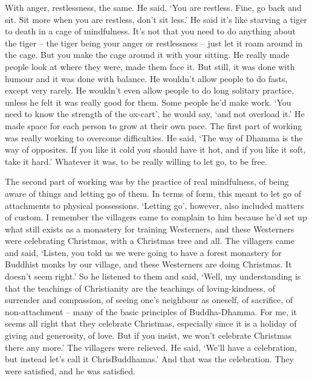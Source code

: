 With anger, restlessness, the same. He said, `You are restless. Fine, go
back and sit. Sit more when you are restless, don't sit less.' He said
it's like starving a tiger to death in a cage of mindfulness. It's not
that you need to do anything about the tiger -- the tiger being your
anger or restlessness -- just let it roam around in the cage. But you
make the cage around it with your sitting. He really made people look at
where they were, made them face it. But still, it was done with humour
and it was done with balance. He wouldn't allow people to do fasts, 
except very rarely. He wouldn't even allow people to do long solitary
practice, unless he felt it was really good for them. Some people he'd
make work. `You need to know the strength of the ox-cart', he would say, 
`and not overload it.' He made space for each person to grow at their
own pace. The first part of working was really working to overcome
difficulties. He said, `The way of Dhamma is the way of opposites. If
you like it cold you should have it hot, and if you like it soft, take
it hard.' Whatever it was, to be really willing to let go, to be free. 

The second part of working was by the practice of real mindfulness, of
being aware of things and letting go of them. In terms of form, this
meant to let go of attachments to physical possessions. `Letting go', 
however, also included matters of custom. I remember the villagers came
to complain to him because he'd set up what still exists as a monastery
for training Westerners, and these Westerners were celebrating
Christmas, with a Christmas tree and all. The villagers came and said, 
`Listen, you told us we were going to have a forest monastery for
Buddhist monks by our village, and these Westerners are doing Christmas. 
It doesn't seem right.' So he listened to them and said, `Well, my
understanding is that the teachings of Christianity are the teachings of
loving-kindness, of surrender and compassion, of seeing one's neighbour
as oneself, of sacrifice, of non-attachment -- many of the basic
principles of Buddha-Dhamma. For me, it seems all right that they
celebrate Christmas, especially since it is a holiday of giving and
generosity, of love. But if you insist, we won't celebrate Christmas
there any more.' The villagers were relieved. He said, `We'll have a
celebration, but instead let's call it ChrisBuddhamas.' And that was the
celebration. They were satisfied, and he was satisfied. 

